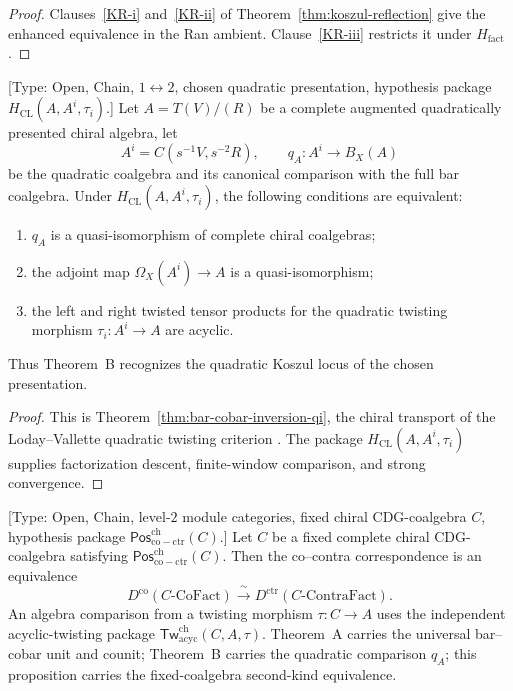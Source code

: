 \begin{proof}
Clauses~\ref{KR-i} and~\ref{KR-ii} of
Theorem~\ref{thm:koszul-reflection} give the enhanced equivalence in
the Ran ambient.  Clause~\ref{KR-iii} restricts it under
$H_{\mathrm{fact}}$.
\end{proof}

\begin{theorem}
\label{thm:mr-B}
\textup{[Type: Open, Chain, $1\leftrightarrow2$, chosen quadratic
presentation, hypothesis package
$H_{\mathrm{CL}}(A,A^i,\tau_i)$.]}
Let $A=T(V)/(R)$ be a complete augmented quadratically presented
chiral algebra, let
\[
 A^i=C(s^{-1}V,s^{-2}R),
 \qquad
 q_A\colon A^i\longrightarrow B_X(A)
\]
be the quadratic coalgebra and its canonical comparison with the full
bar coalgebra.  Under $H_{\mathrm{CL}}(A,A^i,\tau_i)$, the following conditions
are equivalent:
\begin{enumerate}[label=\textup{(\roman*)}]
\item $q_A$ is a quasi-isomorphism of complete chiral coalgebras;
\item the adjoint map $\Omega_X(A^i)\to A$ is a quasi-isomorphism;
\item the left and right twisted tensor products for the quadratic
twisting morphism $\tau_i\colon A^i\to A$ are acyclic.
\end{enumerate}
Thus Theorem~B recognizes the quadratic Koszul locus of the chosen
presentation.
\end{theorem}

\begin{proof}
This is Theorem~\ref{thm:bar-cobar-inversion-qi}, the chiral transport
of the Loday--Vallette quadratic twisting criterion
\cite[Theorems~2.3.2 and~3.4.6]{LV12}.  The package
$H_{\mathrm{CL}}(A,A^i,\tau_i)$ supplies factorization descent,
finite-window comparison, and strong convergence.
\end{proof}

\begin{proposition}
\label{prop:mr-fixed-C-second-kind}
\textup{[Type: Open, Chain, level-$2$ module categories, fixed chiral
CDG-coalgebra $C$, hypothesis package
$\mathsf{Pos}^{\mathrm{ch}}_{\mathrm{co-ctr}}(C)$.]}
Let $C$ be a fixed complete chiral CDG-coalgebra satisfying
$\mathsf{Pos}^{\mathrm{ch}}_{\mathrm{co-ctr}}(C)$.  Then the
co--contra correspondence is an equivalence
\[
 D^{\mathrm{co}}(C\text{-}\mathrm{CoFact})
 \xrightarrow{\ \sim\ }
 D^{\mathrm{ctr}}(C\text{-}\mathrm{ContraFact}).
\]
An algebra comparison from a twisting morphism
$\tau\colon C\to A$ uses the independent acyclic-twisting package
$\mathsf{Tw}^{\mathrm{ch}}_{\mathrm{acyc}}(C,A,\tau)$.
Theorem~A carries the universal bar--cobar unit and counit; Theorem~B
carries the quadratic comparison $q_A$; this proposition carries the
fixed-coalgebra second-kind equivalence.
\end{proposition}

